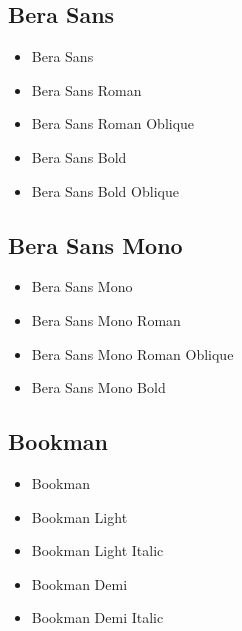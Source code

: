 
    \subsection{Bera Sans}
    \begin{itemize}
        \item {\selectfont Bera Sans}
        \item {\selectfont Bera Sans Roman}
        \item {\selectfont Bera Sans Roman Oblique}
        \item {\selectfont Bera Sans Bold}
        \item {\selectfont Bera Sans Bold Oblique}
    \end{itemize}


    \subsection{Bera Sans Mono}
    \begin{itemize}
        \item {\selectfont Bera Sans Mono}
        \item {\selectfont Bera Sans Mono Roman}
        \item {\selectfont Bera Sans Mono Roman Oblique}
        \item {\selectfont Bera Sans Mono Bold}
    \end{itemize}


    \subsection{Bookman}
    \begin{itemize}
        \item {\selectfont Bookman}
        \item {\selectfont Bookman Light}
        \item {\selectfont Bookman Light Italic}
        \item {\selectfont Bookman Demi}
        \item {\selectfont Bookman Demi Italic}
    \end{itemize}

